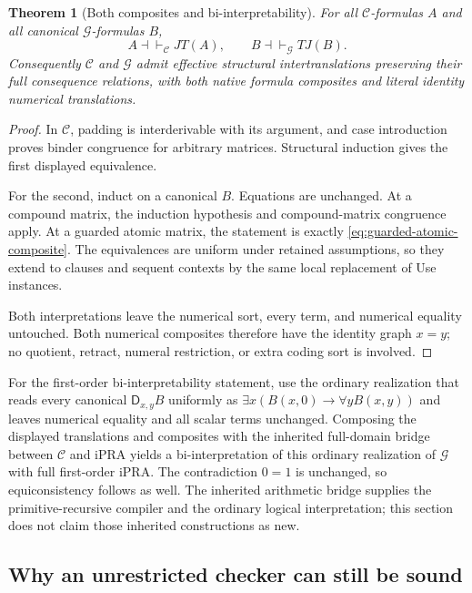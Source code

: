 \documentclass[11pt,letterpaper]{article}
\newtheorem{theorem}{Theorem}[section]
\theoremstyle{definition}
\begin{document}
\begin{theorem}[Both composites and bi-interpretability]
For all $\mathcal C$-formulas $A$ and all canonical
$\mathcal G$-formulas $B$,
\[
 A\dashv\vdash_{\mathcal C}JT(A),\qquad
 B\dashv\vdash_{\mathcal G}TJ(B).
\]
Consequently $\mathcal C$ and $\mathcal G$ admit effective structural
intertranslations preserving their full consequence relations, with
both native formula composites and literal identity numerical
translations.
\end{theorem}
\begin{proof}
In $\mathcal C$, padding is interderivable with its argument, and
case introduction proves binder congruence for arbitrary matrices.
Structural induction gives the first displayed equivalence.

For the second, induct on a canonical $B$.  Equations are unchanged.
At a compound matrix, the induction hypothesis and compound-matrix
congruence apply.  At a guarded atomic matrix, the statement is
exactly \eqref{eq:guarded-atomic-composite}.  The equivalences are
uniform under retained assumptions, so they extend to clauses and
sequent contexts by the same local replacement of Use instances.

Both interpretations leave the numerical sort, every term, and
numerical equality untouched.  Both numerical composites therefore
have the identity graph $x=y$; no quotient, retract, numeral restriction,
or extra coding sort is involved.
\end{proof}

For the first-order bi-interpretability statement, use the ordinary
realization that reads every canonical
$\mathsf D_{x,y}B$ uniformly as
$\exists x(B(x,0)\to\forall yB(x,y))$ and leaves numerical equality
and all scalar terms unchanged.  Composing the displayed translations
and composites with the inherited full-domain bridge between
$\mathcal C$ and iPRA yields a bi-interpretation of this ordinary
realization of $\mathcal G$ with full first-order iPRA.
The contradiction $0=1$ is
unchanged, so equiconsistency follows as well.  The inherited arithmetic
bridge supplies the primitive-recursive compiler and the ordinary
logical interpretation; this section does not claim those inherited
constructions as new.

\subsection{Why an unrestricted checker can still be sound}
\end{document}
